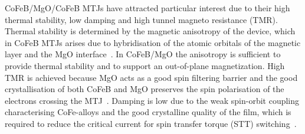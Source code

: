 \documentclass[aps,prb,signlecolumn,preprint,superscriptaddress,10]{revtex4-1}
\begin{document}
CoFeB/MgO/CoFeB MTJs have attracted particular interest due to their high thermal stability, low damping and high tunnel magneto resistance (TMR). 
Thermal stability is determined by the magnetic anisotropy of the device, which in CoFeB MTJs arises due to hybridisation of the atomic orbitals of the magnetic layer and the MgO interface~\cite{samsung-review,:/content/aip/journal/apl/105/22/10.1063/1.4903296,Peng2015}. In CoFeB/MgO the anisotropy is sufficient to provide thermal stability and to support an out-of-plane magnetization. High TMR is achieved because MgO acts as a good spin filtering barrier and the good crystallisation of both CoFeB and MgO preserves the spin polarisation of the electrons crossing the MTJ~\cite{TMR_CoFeMgO,:/content/aip/journal/jap/101/1/10.1063/1.2407270,4160113,samsung-review,CoFeB-MgO_TMR}. Damping is low due to the weak spin-orbit coupling characterising CoFe-alloys and the good crystalline quality of the film, which is required to reduce the critical current for spin transfer torque (STT) switching~\cite{samsung-review}.
\end{document}
